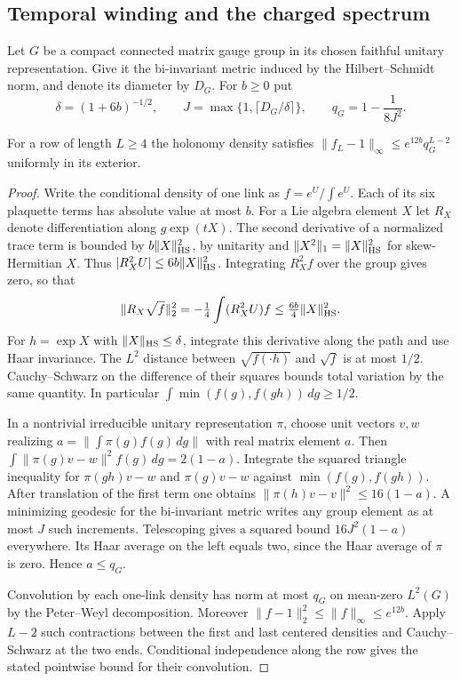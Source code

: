 \subsection{Temporal winding and the charged spectrum}
\label{cl:sec:charged-spectrum}
Let $G$ be a compact connected matrix gauge group in its chosen faithful
unitary representation. Give it the bi-invariant metric induced by the
Hilbert--Schmidt norm, and denote its diameter by $D_G$. For $b\ge0$ put
\[
 \delta=(1+6b)^{-1/2},\qquad
 J=\max\{1,\lceil D_G/\delta\rceil\},\qquad
 q_G=1-\frac{1}{8J^2}.
\]
\begin{lemma}\label{cl:lem:general-row}
For a row of length $L\ge4$ the holonomy density satisfies
$\|f_L-1\|_\infty\le e^{12b}q_G^{L-2}$ uniformly in its exterior.
\end{lemma}
\begin{proof}
Write the conditional density of one link as $f=e^U/\int e^U$.
Each of its six plaquette terms has absolute value at most $b$.
For a Lie algebra element $X$ let $R_X$ denote differentiation along
$g\exp(tX)$. The second derivative of a normalized trace term is
bounded by $b\|X\|_{\rm HS}^2$, by unitarity and
$\|X^2\|_1=\|X\|_{\rm HS}^2$ for skew-Hermitian $X$.
Thus $|R_X^2 U|\le6b\|X\|_{\rm HS}^2$. Integrating $R_X^2 f$ over
the group gives zero, so that
\[
 \|R_X\sqrt f\|_2^2=-\tfrac14\int (R_X^2 U) f
 \le\tfrac{6b}{4}\|X\|_{\rm HS}^2 .
\]
For $h=\exp X$ with $\|X\|_{\rm HS}\le\delta$, integrate this derivative
along the path and use Haar invariance. The $L^2$ distance between
$\sqrt{f(\cdot h)}$ and $\sqrt f$ is at most $1/2$. Cauchy--Schwarz
on the difference of their squares bounds total variation by the same
quantity. In particular $\int\min(f(g),f(gh))\,dg\ge1/2$.

In a nontrivial irreducible unitary representation $\pi$, choose unit
vectors $v,w$ realizing $a=\|\int\pi(g)f(g)\,dg\|$ with real matrix
element $a$. Then $\int\|\pi(g)v-w\|^2f(g)\,dg=2(1-a)$.
Integrate the squared triangle inequality for $\pi(gh)v-w$ and
$\pi(g)v-w$ against $\min(f(g),f(gh))$. After translation of the first
term one obtains $\|\pi(h)v-v\|^2\le16(1-a)$. A minimizing geodesic
for the bi-invariant metric writes any group element as at most $J$
such increments. Telescoping gives a squared bound $16J^2(1-a)$
everywhere. Its Haar average on the left equals two, since the Haar
average of $\pi$ is zero. Hence $a\le q_G$.

Convolution by each one-link density has norm at most $q_G$ on
mean-zero $L^2(G)$ by the Peter--Weyl decomposition. Moreover
$\|f-1\|_2^2\le\|f\|_\infty\le e^{12b}$. Apply $L-2$ such contractions
between the first and last centered densities and Cauchy--Schwarz at
the two ends. Conditional independence along the row gives the stated
pointwise bound for their convolution.
\end{proof}

